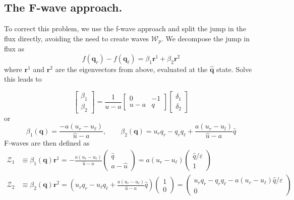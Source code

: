 \documentclass{article}
\begin{document}
\subsection{The F-wave approach.} To correct this problem, we use the f-wave approach and
split the jump in the flux directly, avoiding the need to create waves $\mathcal W_p$.  
We decompose the jump in flux as
\begin{equation}
f(\mathbf q_r) - f(\mathbf q_\ell) = \beta_1 \mathbf r^1 + \beta_2\mathbf r^2
\end{equation}
where $\mathbf r^1$ and $\mathbf r^2$ are the eigenvectors from above, evaluated at the $\widehat{\mathbf q}$ state.   Solve this leads to 

\begin{equation}
\left[\begin{array}{c} \beta_1 \\ \beta_2 \end{array}\right] = \frac{1}{u-a}
\left[
\begin{array}{rr}
0 & -1 \\ u-a & q
\end{array}
\right]
\left[
\begin{array}{r}
\delta_1 \\ \delta_2
\end{array}
\right]
\end{equation}
or 
\begin{equation}
\beta_1(\mathbf q) = \frac{-a(u_r - u_\ell)}{\widehat{u}-a}, \qquad 
\beta_2(\mathbf q) = u_rq_r - q_rq_\ell + \frac{a(u_r - u_l)}{\widehat{u}-a} \widehat{q}
\end{equation}
F-waves are then defined as 
\begin{align}
\mathcal Z_1 & \equiv \beta_1(\mathbf q) \mathbf r^1 = - \frac{a(u_r - u_\ell)}{\widehat{u}-a} 
\left(\begin{array}{c} \widehat{q} \\ a - \widehat{u}\end{array}\right) 
= a(u_r - u_\ell) \left(\begin{array}{c} \widehat{q}/\varepsilon \\ 1 \end{array}\right) \\
\mathcal Z_2 & \equiv \beta_2(\mathbf q) \mathbf r^2 =
\left(u_r q_r - u_\ell q_\ell + \frac{a(u_r - u_\ell)}{\widehat{u}-a}\widehat{q} \right)
\left(\begin{array}{c} 1 \\ 0\end{array}\right) 
= \left(\begin{array}{c} u_r q_r - q_r q_\ell - a(u_r - u_\ell) \widehat{q}/\varepsilon \\ 
0 \end{array}\right) 
\end{align}
\end{document}
